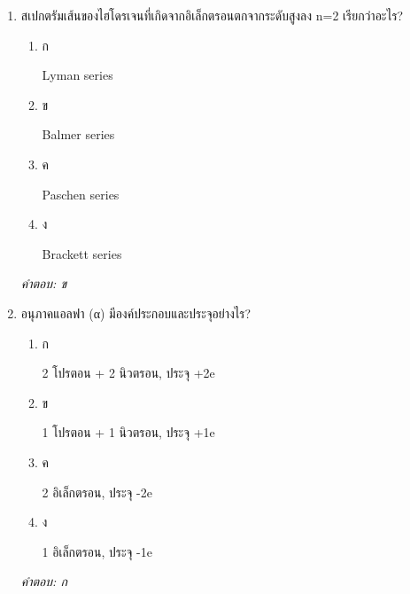 \documentclass[12pt]{article}
\begin{document}
\begin{enumerate}[label=\arabic*., itemsep=0.5\baselineskip, topsep=0.5\baselineskip, leftmargin=*]
\item สเปกตรัมเส้นของไฮโดรเจนที่เกิดจากอิเล็กตรอนตกจากระดับสูงลง n=2 เรียกว่าอะไร?
\begin{enumerate}[label=\alph*)., itemsep=0.3\baselineskip, topsep=0.3\baselineskip]
\item ก\ 
\begin{minipage}[t]{0.9\linewidth}
\raggedright Lyman series
\end{minipage}
\item ข\ 
\begin{minipage}[t]{0.9\linewidth}
\raggedright Balmer series
\end{minipage}
\item ค\ 
\begin{minipage}[t]{0.9\linewidth}
\raggedright Paschen series
\end{minipage}
\item ง\ 
\begin{minipage}[t]{0.9\linewidth}
\raggedright Brackett series
\end{minipage}
\end{enumerate}
\vspace{-0.3\baselineskip}
\begin{small}
\textit{คำตอบ: ข}
\end{small}

\item อนุภาคแอลฟา (α) มีองค์ประกอบและประจุอย่างไร?
\begin{enumerate}[label=\alph*)., itemsep=0.3\baselineskip, topsep=0.3\baselineskip]
\item ก\ 
\begin{minipage}[t]{0.9\linewidth}
\raggedright 2 โปรตอน + 2 นิวตรอน, ประจุ +2e
\end{minipage}
\item ข\ 
\begin{minipage}[t]{0.9\linewidth}
\raggedright 1 โปรตอน + 1 นิวตรอน, ประจุ +1e
\end{minipage}
\item ค\ 
\begin{minipage}[t]{0.9\linewidth}
\raggedright 2 อิเล็กตรอน, ประจุ -2e
\end{minipage}
\item ง\ 
\begin{minipage}[t]{0.9\linewidth}
\raggedright 1 อิเล็กตรอน, ประจุ -1e
\end{minipage}
\end{enumerate}
\vspace{-0.3\baselineskip}
\begin{small}
\textit{คำตอบ: ก}
\end{small}


\end{enumerate}
\end{document}
